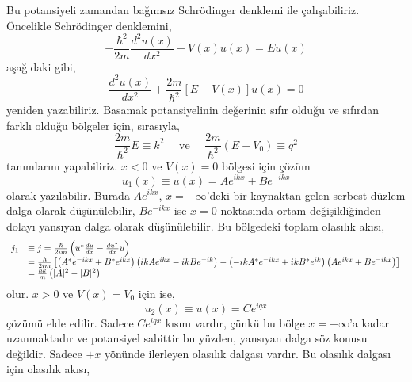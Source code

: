 \documentclass[a4paper,12pt, twoside]{article}
\begin{document}
Bu potansiyeli zamandan bağımsız Schrödinger denklemi ile çalışabiliriz. Öncelikle Schrödinger denklemini,
\begin{equation}
- \frac { \hbar ^ { 2 } } { 2 m } \frac { d ^ { 2 } u ( x ) } { d x ^ { 2 } } + V ( x ) u ( x ) = E u ( x )
\end{equation}
aşağıdaki gibi,
\begin{equation}
\frac { d ^ { 2 } u ( x ) } { d x ^ { 2 } } + \frac { 2 m } { \hbar ^ { 2 } } [ E - V ( x ) ] u ( x ) = 0
\end{equation}
yeniden yazabiliriz. Basamak potansiyelinin değerinin sıfır olduğu ve sıfırdan farklı olduğu bölgeler için, sırasıyla,
\begin{equation}
\frac { 2 m} { \hbar ^ { 2 } } E \equiv k ^ { 2 } \quad \text{ ve } \quad \frac { 2 m} { \hbar ^ { 2 } }  \left( E - V _ { 0 } \right)  \equiv q ^ { 2 }
\end{equation}
tanımlarını yapabiliriz. $x<0$ ve $V(x)=0$ bölgesi için çözüm
\begin{equation}
u_1 ( x ) \equiv u ( x ) = A e ^ { i k x } + B e ^ { - i k x }
\end{equation}
olarak yazılabilir. Burada $A e ^ { i k x }$, $x=-\infty$'deki bir kaynaktan gelen serbest düzlem dalga olarak düşünülebilir, $B e ^ { -i k x }$ ise $x=0$ noktasında ortam değişikliğinden dolayı yansıyan dalga olarak düşünülebilir. Bu bölgedeki toplam olasılık akısı,
\begin{equation}
\begin{array} { r l } 
{ j_1 } &\equiv  j  = \frac { \hbar } { 2 i m } \left( u ^ { * } \frac { d u } { d x } - \frac { d u ^ { * } } { d x } u \right) \\
& = \frac { \hbar } { 2 i m } \left[ \left(A^{*} e ^ { - i k x } + B ^ { * } e ^ { i k x } \right) \left(i k A e ^ { i k x } - i k B e ^ { - i k } \right) - \left( -i k A^{*} e ^ { -i k x } + i k B^* e ^ {  i k } \right) \left( A e ^ { i k x } + B  e ^ { -i k x } \right)  \right]  \\ 
{ } & { = \frac { \hbar k } { m } \left( | A | ^ { 2 }  - | B | ^ { 2 } \right) } \end{array}
\end{equation}
olur. $x>0$ ve $V(x)=V_0$ için ise,
\begin{equation}
u_2 ( x ) \equiv u ( x ) =  C e ^ { i q x }
\end{equation}
çözümü elde edilir. Sadece $C e ^ { i q x }$ kısmı vardır, çünkü bu bölge $x=+\infty$'a kadar uzanmaktadır ve potansiyel sabittir bu yüzden, yansıyan dalga söz konusu değildir. Sadece $+x$ yönünde ilerleyen olasılık dalgası vardır. Bu olasılık dalgası için olasılık akısı,
\end{document}
